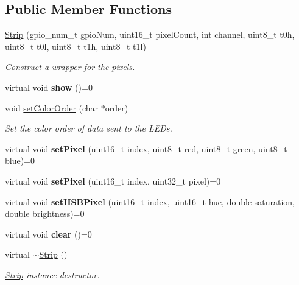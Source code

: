 \subsection*{Public Member Functions}
\begin{DoxyCompactItemize}
\item 
\mbox{\hyperlink{classStrip_a3f99a9018282c2a0633cf62955967697}{Strip}} (gpio\+\_\+num\+\_\+t gpio\+Num, uint16\+\_\+t pixel\+Count, int channel, uint8\+\_\+t t0h, uint8\+\_\+t t0l, uint8\+\_\+t t1h, uint8\+\_\+t t1l)
\begin{DoxyCompactList}\small\item\em Construct a wrapper for the pixels. \end{DoxyCompactList}\item 
\mbox{\label{classStrip_a0192e2ca6d2d0885aadaa08b2d1eeca3}} 
virtual void {\bfseries show} ()=0
\item 
void \mbox{\hyperlink{classStrip_a0293ce394b65cbe1da38a7ece0c3f867}{set\+Color\+Order}} (char $\ast$order)
\begin{DoxyCompactList}\small\item\em Set the color order of data sent to the L\+E\+Ds. \end{DoxyCompactList}\item 
\mbox{\label{classStrip_acd1ab122f1e375bab307cbc066037ddc}} 
virtual void {\bfseries set\+Pixel} (uint16\+\_\+t index, uint8\+\_\+t red, uint8\+\_\+t green, uint8\+\_\+t blue)=0
\item 
\mbox{\label{classStrip_a9ab7cf4699af242f4bcb7d5b74b3b272}} 
virtual void {\bfseries set\+Pixel} (uint16\+\_\+t index, uint32\+\_\+t pixel)=0
\item 
\mbox{\label{classStrip_a986a00dffa7445db730ded4fc692d190}} 
virtual void {\bfseries set\+H\+S\+B\+Pixel} (uint16\+\_\+t index, uint16\+\_\+t hue, double saturation, double brightness)=0
\item 
\mbox{\label{classStrip_a0b7a21b28a894a63b09a6bc5b2389c18}} 
virtual void {\bfseries clear} ()=0
\item 
\mbox{\label{classStrip_afa6b56c5e468eb0a5146cfb59a4c80f5}} 
virtual \mbox{\hyperlink{classStrip_afa6b56c5e468eb0a5146cfb59a4c80f5}{$\sim$\+Strip}} ()
\begin{DoxyCompactList}\small\item\em \mbox{\hyperlink{classStrip}{Strip}} instance destructor. \end{DoxyCompactList}\end{DoxyCompactItemize}
